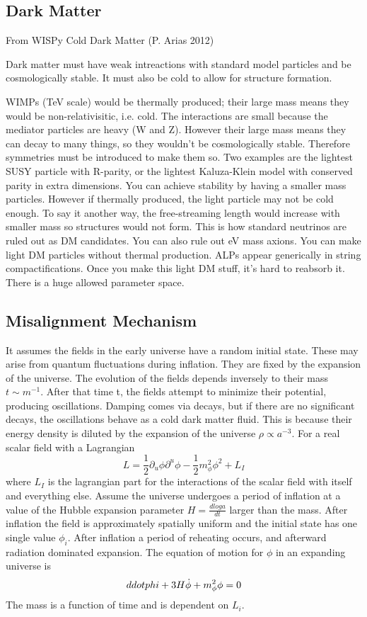 \documentclass[11pt]{book}
\begin{document}
\subsection{Dark Matter}

From WISPy Cold Dark Matter (P. Arias 2012)

Dark matter must have weak intreactions with standard model particles and be cosmologically stable. It must also be cold to allow for structure formation.

WIMPs (TeV scale) would be thermally produced; their large mass means they would be non-relativisitic, i.e. cold. The interactions are small because the mediator particles are heavy (W and Z). However their large mass means they can decay to many things, so they wouldn't be cosmologically stable. Therefore symmetries must be introduced to make them so. Two examples are the lightest SUSY particle with R-parity, or the lightest Kaluza-Klein model with conserved parity in extra dimensions.
You can achieve stability by having a smaller mass particles. However if thermally produced, the light particle may not be cold enough. To say it another way, the free-streaming length would increase with smaller mass so structures would not form. This is how standard neutrinos are ruled out as DM candidates. You can also rule out eV mass axions.
You can make light DM particles without thermal production. ALPs appear generically in string compactifications. Once you make this light DM stuff, it's hard to reabsorb it. There is a huge allowed parameter space.
\subsection{Misalignment Mechanism}
It assumes the fields in the early universe have a random initial state. These may arise from quantum fluctuations during inflation. They are fixed by the expansion of the universe. The evolution of the fields depends inversely to their mass $t \sim m^{-1}$. After that time t, the fields attempt to minimize their potential, producing oscillations. Damping comes via decays, but if there are no significant decays, the oscillations behave as a cold dark matter fluid. This is because their energy density is diluted by the expansion of the universe $\rho \propto a^{-3}$.
For a real scalar field with a Lagrangian
$$L = \frac{1}{2}\partial_u \phi \partial^u \phi - \frac{1}{2}m_{\phi}^2\phi^2 + L_I$$
where $L_I$ is the lagrangian part for the interactions of the scalar field with itself and everything else. Assume the universe undergoes a period of inflation at a value of the Hubble expansion parameter $H = \frac{d log a}{dt}$ larger than the mass. After inflation the field is approximately spatially uniform and the initial state has one single value $\phi_i$. After inflation a period of reheating occurs, and afterward radiation dominated expansion. The equation of motion for $\phi$ in an expanding universe is 
$$\\ddot phi + 3 H \dot \phi + m_\phi^2 \phi = 0$$
The mass is a function of time and is dependent on $L_i$.
\end{document}
